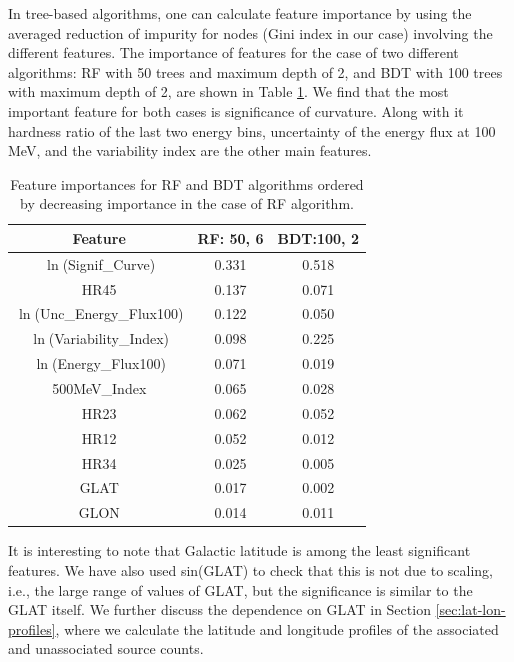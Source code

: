 In tree-based algorithms, one can calculate feature importance by using the averaged reduction of impurity for nodes (Gini index in our case) involving the different features. 
The importance of features for the case of two different algorithms: RF with 50 trees and maximum depth of 2, and BDT with 100 trees with maximum depth of 2,  are shown in Table \ref{tab:feat_imp}.
We find that the most important feature for both cases is significance of curvature. Along with it hardness ratio of the last two energy bins, uncertainty of the energy flux at 100 MeV, and the variability index are the other main features.



\begin{table}[!h]
\tiny
\centering
\renewcommand{\tabcolsep}{1mm}
\renewcommand{\arraystretch}{1}

\begin{tabular}{c c c}
\hline
\hline
Feature & RF: 50, 6& BDT:100, 2\\
\hline
{ $\ln$(Signif\_Curve)}&  0.331  & 0.518   \\
{ HR45}&0.137&0.071\\
{ $\ln$(Unc\_Energy\_Flux100)} &0.122& 0.050   \\
$\ln$(Variability\_Index)& 0.098&0.225  \\
$\ln$(Energy\_Flux100) & 0.071&0.019   \\
500MeV\_Index&0.065& 0.028  \\
HR23 & 0.062&0.052  \\
HR12& 0.052&0.012  \\
HR34&0.025&0.005\\
GLAT &0.017& 0.002     \\
GLON & 0.014&0.011  \\
\hline
\end{tabular}
\vspace{0.4cm}
\caption{Feature importances for RF and BDT algorithms ordered by decreasing importance 
in the case of RF algorithm.
}
\label{tab:feat_imp}
\end{table}

It is interesting to note that Galactic latitude is among the least significant features.
We have also used sin(GLAT) to check that this is not due to scaling, i.e., the large range of values of GLAT,
but the significance is similar to the GLAT itself.
We further discuss the dependence on GLAT in Section \ref{sec:lat-lon-profiles}, 
where we calculate the latitude and longitude profiles of the associated and unassociated source counts.
